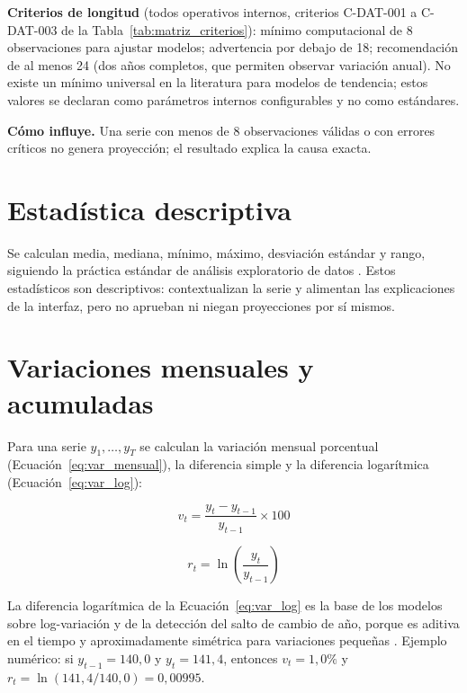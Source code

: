 \documentclass[12pt]{article}
\begin{document}
\textbf{Criterios de longitud} (todos operativos internos, criterios C-DAT-001 a C-DAT-003 de la Tabla~\ref{tab:matriz_criterios}): m\'inimo computacional de 8 observaciones para ajustar modelos; advertencia por debajo de 18; recomendaci\'on de al menos 24 (dos a\~nos completos, que permiten observar variaci\'on anual). No existe un m\'inimo universal en la literatura para modelos de tendencia; estos valores se declaran como par\'ametros internos configurables y no como est\'andares.

\textbf{C\'omo influye.} Una serie con menos de 8 observaciones v\'alidas o con errores cr\'iticos no genera proyecci\'on; el resultado explica la causa exacta.

\section{Estad\'istica descriptiva}
\label{sec:descriptiva}

Se calculan media, mediana, m\'inimo, m\'aximo, desviaci\'on est\'andar y rango, siguiendo la pr\'actica est\'andar de an\'alisis exploratorio de datos \citep{nist_eda_summary}. Estos estad\'isticos son descriptivos: contextualizan la serie y alimentan las explicaciones de la interfaz, pero no aprueban ni niegan proyecciones por s\'i mismos.

\section{Variaciones mensuales y acumuladas}
\label{sec:variaciones}

Para una serie $y_1,\dots,y_T$ se calculan la variaci\'on mensual porcentual (Ecuaci\'on~\ref{eq:var_mensual}), la diferencia simple y la diferencia logar\'itmica (Ecuaci\'on~\ref{eq:var_log}):

\begin{equation}
v_t = \frac{y_t - y_{t-1}}{y_{t-1}} \times 100
\label{eq:var_mensual}
\end{equation}

\begin{equation}
r_t = \ln\!\left(\frac{y_t}{y_{t-1}}\right)
\label{eq:var_log}
\end{equation}

La diferencia logar\'itmica de la Ecuaci\'on~\ref{eq:var_log} es la base de los modelos sobre log-variaci\'on y de la detecci\'on del salto de cambio de a\~no, porque es aditiva en el tiempo y aproximadamente sim\'etrica para variaciones peque\~nas \citep{hyndman2021fpp3}. Ejemplo num\'erico: si $y_{t-1}=140{,}0$ y $y_t=141{,}4$, entonces $v_t=1{,}0\%$ y $r_t=\ln(141{,}4/140{,}0)=0{,}00995$.
\end{document}
